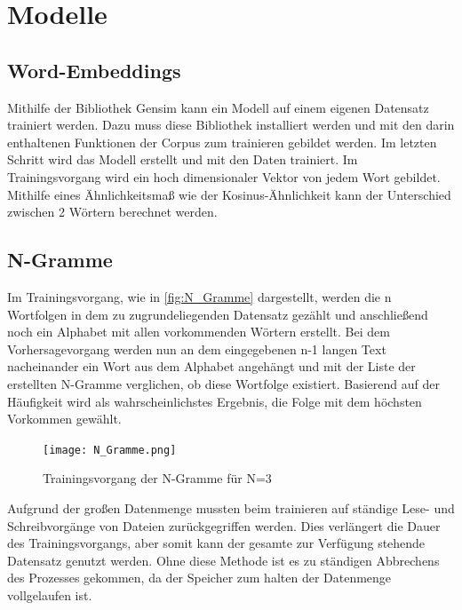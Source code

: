 \chapter{Modelle}
\section{Word-Embeddings}
Mithilfe der Bibliothek Gensim kann ein Modell auf einem eigenen Datensatz trainiert werden. Dazu muss diese Bibliothek installiert werden und mit den darin enthaltenen Funktionen der Corpus zum trainieren gebildet werden. Im letzten Schritt wird das Modell erstellt und mit den Daten trainiert. Im Trainingsvorgang wird ein hoch dimensionaler Vektor von jedem Wort gebildet. Mithilfe eines Ähnlichkeitsmaß wie der Kosinus-Ähnlichkeit kann der Unterschied zwischen 2 Wörtern berechnet werden. 

\section{N-Gramme}
Im Trainingsvorgang, wie in \autoref{fig:N_Gramme} dargestellt, werden die n Wortfolgen in dem zu zugrundeliegenden Datensatz gezählt und anschließend noch ein Alphabet mit allen vorkommenden Wörtern erstellt. Bei dem Vorhersagevorgang werden nun an dem eingegebenen n-1 langen Text nacheinander ein Wort aus dem Alphabet angehängt und mit der Liste der erstellten N-Gramme verglichen, ob diese Wortfolge existiert. Basierend auf der Häufigkeit wird als wahrscheinlichstes Ergebnis, die Folge mit dem höchsten Vorkommen gewählt. 

\begin{figure}[h]
	\centering
	\texttt{[image: N\_Gramme.png]}
	\caption{Trainingsvorgang der N-Gramme für N=3}
	\label{fig:N_Gramme}
\end{figure}

Aufgrund der großen Datenmenge mussten beim trainieren auf ständige Lese- und Schreibvorgänge von Dateien zurückgegriffen werden. Dies verlängert die Dauer des Trainingsvorgangs, aber somit kann der gesamte zur Verfügung stehende Datensatz genutzt werden. Ohne diese Methode ist es zu ständigen Abbrechens des Prozesses gekommen, da der Speicher zum halten der Datenmenge vollgelaufen ist.


